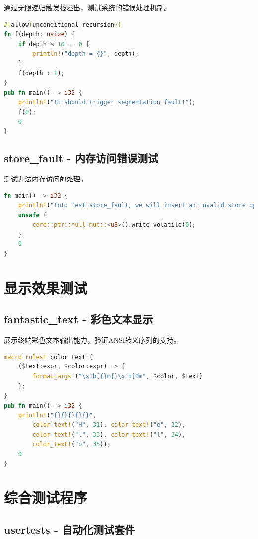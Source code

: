 通过无限递归触发栈溢出，测试系统的错误处理机制。

\begin{lstlisting}[language=Rust]
#[allow(unconditional_recursion)]
fn f(depth: usize) {
    if depth % 10 == 0 {
        println!("depth = {}", depth);
    }
    f(depth + 1);
}
pub fn main() -> i32 {
    println!("It should trigger segmentation fault!");
    f(0);
    0
}
\end{lstlisting}

\subsection{store\_fault - 内存访问错误测试}

测试非法内存访问的处理。

\begin{lstlisting}[language=Rust]
fn main() -> i32 {
    println!("Into Test store_fault, we will insert an invalid store operation...");
    unsafe {
        core::ptr::null_mut::<u8>().write_volatile(0);
    }
    0
}
\end{lstlisting}

\section{显示效果测试}

\subsection{fantastic\_text - 彩色文本显示}

展示终端彩色文本输出能力，验证ANSI转义序列的支持。

\begin{lstlisting}[language=Rust]
macro_rules! color_text {
    ($text:expr, $color:expr) => {
        format_args!("\x1b[{}m{}\x1b[0m", $color, $text)
    };
}
pub fn main() -> i32 {
    println!("{}{}{}{}{}",
        color_text!("H", 31), color_text!("e", 32),
        color_text!("l", 33), color_text!("l", 34),
        color_text!("o", 35));
    0
}
\end{lstlisting}

\section{综合测试程序}

\subsection{usertests - 自动化测试套件}


